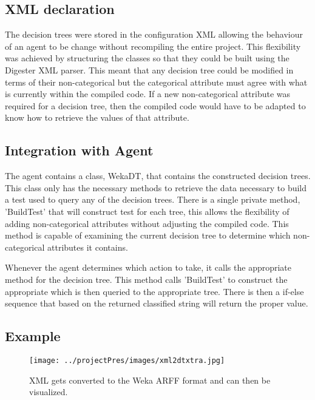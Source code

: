 \subsection{XML declaration}

The decision trees were stored in the configuration XML allowing the behaviour of an agent to be change without
recompiling the entire project.  This flexibility was achieved by structuring the classes so that 
they could be built using the Digester XML parser.  This meant that any decision tree could be modified in 
terms of their non-categorical but the categorical attribute must agree with what is currently within the 
compiled code.  If a new non-categorical attribute was required for a decision tree, then the compiled code would
have to be adapted to know how to retrieve the values of that attribute.

\subsection{Integration with Agent}

The agent contains a class, WekaDT, that contains the constructed decision trees.  This class only has
the necessary methods to retrieve the data necessary to build a test used to query any of the decision
trees.  There is a single private method, 'BuildTest' that will construct test for each tree, this allows the flexibility
of adding non-categorical attributes without adjusting the compiled code.  This method is capable of
examining the current decision tree to determine which non-categorical attributes it contains.

Whenever the agent determines which action to take, it calls the appropriate method for the decision 
tree.  This method calls 'BuildTest' to construct the appropriate which is then queried to the
appropriate tree.  There is then a if-else sequence that based on the returned classified string
will return the proper value.

\subsection{Example}

\begin{figure}[h!]
  \centering  
  \texttt{[image: ../projectPres/images/xml2dtxtra.jpg]}
  \caption{XML gets converted to the Weka ARFF format and can then be visualized.}
  \label{fig:xml2dt}
\end{figure}


